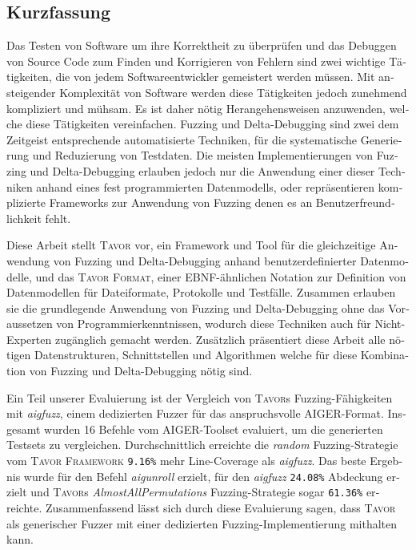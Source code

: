 \begin{otherlanguage}{german}

\chapter*{Kurzfassung}

Das Testen von Software um ihre Korrektheit zu überprüfen und das Debuggen von Source Code zum Finden und Korrigieren von Fehlern sind zwei wichtige Tätigkeiten, die von jedem Softwareentwickler gemeistert werden müssen. Mit ansteigender Komplexität von Software werden diese Tätigkeiten jedoch zunehmend kompliziert und mühsam. Es ist daher nötig Herangehensweisen anzuwenden, welche diese Tätigkeiten vereinfachen. Fuzzing und Delta-Debugging sind zwei dem Zeitgeist entsprechende automatisierte Techniken, für die systematische Generierung und Reduzierung von Testdaten. Die meisten Implementierungen von Fuzzing und Delta-Debugging erlauben jedoch nur die Anwendung einer dieser Techniken anhand eines fest programmierten Datenmodells, oder repräsentieren komplizierte Frameworks zur Anwendung von Fuzzing denen es an Benutzerfreundlichkeit fehlt.

Diese Arbeit stellt \textsc{Tavor} vor, ein Framework und Tool für die gleichzeitige Anwendung von Fuzzing und Delta-Debugging anhand benutzerdefinierter Datenmodelle, und das \textsc{Tavor Format}, einer EBNF-ähnlichen Notation zur Definition von Datenmodellen für Dateiformate, Protokolle und Testfälle. Zusammen erlauben sie die grundlegende Anwendung von Fuzzing und Delta-Debugging ohne das Voraussetzen von Programmierkenntnissen, wodurch diese Techniken auch für Nicht-Experten zugänglich gemacht werden. Zusätzlich präsentiert diese Arbeit alle nötigen Datenstrukturen, Schnittstellen und Algorithmen welche für diese Kombination von Fuzzing und Delta-Debugging nötig sind.

Ein Teil unserer Evaluierung ist der Vergleich von \textsc{Tavor}s Fuzzing-Fähigkeiten mit \emph{aigfuzz}, einem dedizierten Fuzzer für das anspruchsvolle AIGER-Format. Insgesamt wurden 16 Befehle vom AIGER-Toolset evaluiert, um die generierten Testsets zu vergleichen. Durchschnittlich erreichte die \emph{random} Fuzzing-Strategie vom \textsc{Tavor Framework} \texttt{9.16\%} mehr Line-Coverage als \emph{aigfuzz}. Das beste Ergebnis wurde für den Befehl \emph{aigunroll} erzielt, für den \emph{aigfuzz} \texttt{24.08\%} Abdeckung erzielt und \textsc{Tavor}s \emph{AlmostAllPermutations} Fuzzing-Strategie sogar \texttt{61.36\%} erreichte. Zusammenfassend lässt sich durch diese Evaluierung sagen, dass \textsc{Tavor} als generischer Fuzzer mit einer dedizierten Fuzzing-Implementierung mithalten kann.

\end{otherlanguage}
